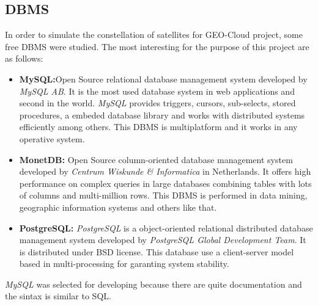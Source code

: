 \subsection{DBMS}

In order to simulate the constellation of satellites for GEO-Cloud project, some
free \ac{DBMS} were studied. The most interesting for the purpose of this project are
as follows:
\begin{itemize}
\item \textbf{MySQL:}Open Source relational database management system developed by
  \emph{MySQL AB}. It is the most used database system in web applications and
  second in the world. \emph{MySQL} provides triggers, cursors, sub-selects, stored
  procedures, a embeded database library and works with distributed systems
  efficiently among others. This \ac{DBMS} is multiplatform and it works in any
  operative system. 
\item \textbf{MonetDB:} Open Source column-oriented database management system
  developed by \emph{Centrum Wiskunde \& Informatica} in Netherlands. It offers
  high performance on complex queries in large databases combining tables with
  lots of columns and multi-million rows. This \ac{DBMS} is performed in data
  mining, geographic information systems and others like that.
\item \textbf{PostgreSQL:} \emph{PostgreSQL} is a object-oriented relational
  distributed database management system developed by \emph{PostgreSQL Global
    Development Team}. It is distributed under \ac{BSD} license. This database use a
  client-server model based in multi-processing for garanting system stability.
\end{itemize} 

\emph{MySQL} was selected for developing because there are quite documentation and the
sintax is similar to \ac{SQL}.

